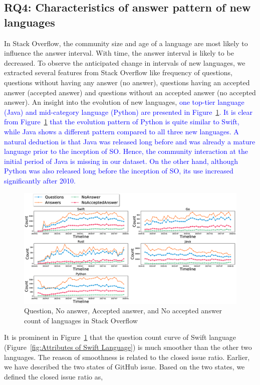 \subsection{RQ4: Characteristics of answer pattern of new languages}
\label{RQ4}
In Stack Overflow, the community size and age of a language are most likely to influence the answer interval. With time, the answer interval is likely to be decreased. To observe the anticipated change in intervals of new languages, we extracted several features from Stack Overflow like frequency of questions, questions without having any answer (no answer), questions having an accepted answer (accepted answer) and questions without an accepted answer (no accepted answer). An insight into the evolution of new languages, \textcolor{blue}{one top-tier language (Java) and mid-category language (Python)
are presented in Figure~\ref{fig:Evolution of new languages}. It is clear from Figure~\ref{fig:Evolution of new languages} that the evolution pattern of Python is quite similar to Swift, while Java shows a different pattern compared to all three new languages. A natural deduction is  that Java was released long before and was already a mature language prior to the inception of SO.  Hence, the community interaction at the initial period of Java is missing in our dataset. On the other hand, although Python was also released long before the inception of SO, its  use increased significantly after 2010\citep{TIOBE:index}.}

\begin{figure}[htbp]

\includegraphics[scale=0.28]{figures/Evolution.eps} 
\caption{Question, No answer, Accepted answer, and No accepted answer count of languages in Stack Overflow}
\label{fig:Evolution of new languages}
\end{figure}

\iffalse
It is prominent in Figure~\ref{fig:Evolution of new languages} that the question count curve of Swift language (Figure~\ref{fig:Attributes of Swift Language}) is much smoother than the other two languages. The reason of smoothness is related to the closed issue ratio. Earlier, we have described the two states of GitHub issue. Based on the two states, we defined the closed issue ratio as,


